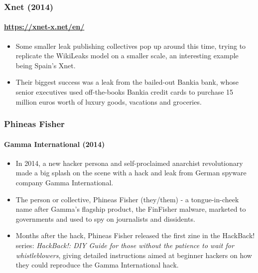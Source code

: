 \documentclass[aspectratio=169,usenames,dvipsnames]{beamer}
\begin{document}
\begin{frame}
  \frametitle{Xnet (2014)}
  \framesubtitle{\url{https://xnet-x.net/en/}}

  \begin{itemize}[<+->]
    \item Some smaller leak publishing collectives pop up around this time,
      trying to replicate the WikiLeaks model on a smaller scale, an
      interesting example being Spain's Xnet.

    \item Their biggest success was a leak from the bailed-out Bankia bank,
      whose senior executives used off-the-books Bankia credit cards to
      purchase 15 million euros worth of luxury goods, vacations and
      groceries.
  \end{itemize}

\end{frame}

\begin{frame}
  \frametitle{Phineas Fisher}
  \framesubtitle{Gamma International (2014)}

  \begin{itemize}[<+->]
    \item In 2014, a new hacker persona and self-proclaimed anarchist
      revolutionary made a big splash on the scene with a hack and leak from
      German spyware company Gamma International.

    \item The person or collective, Phineas Fisher (they/them) - a
      tongue-in-cheek name after Gamma's flagship product, the FinFisher
      malware, marketed to governments and used to spy on journalists and
      dissidents.

    \item Months after the hack, Phineas Fisher released the first zine in
      the HackBack! series: \emph{HackBack!: DIY Guide for those without the
      patience to wait for whistleblowers}, giving detailed instructions aimed
      at beginner hackers on how they could reproduce the Gamma International
      hack.
  \end{itemize}

\end{frame}
\end{document}
